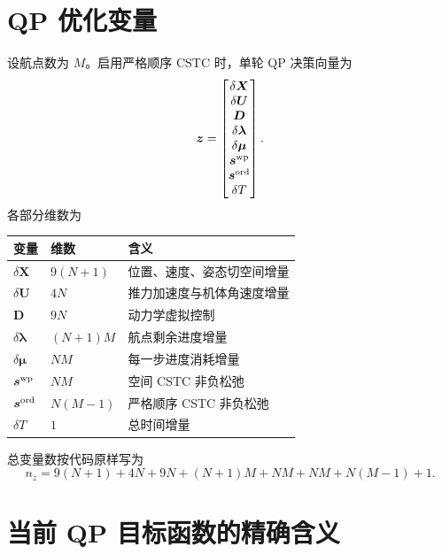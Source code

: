 \documentclass[UTF8,a4paper,11pt]{ctexart}
\begin{document}
\section{QP 优化变量}

设航点数为 $M$。启用严格顺序 CSTC 时，单轮 QP 决策向量为
\begin{equation}
 \bm z=\begin{bmatrix}
 \delta\bm X\\
 \delta\bm U\\
 \bm D\\
 \delta\bm\lambda\\
 \delta\bm\mu\\
 \bm s^{\rm wp}\\
 \bm s^{\rm ord}\\
 \delta T
 \end{bmatrix}.
 \label{eq:variables}
\end{equation}
各部分维数为
\begin{center}
\begin{tabular}{lll}
\toprule
变量 & 维数 & 含义\\
\midrule
$\delta\bm X$ & $9(N+1)$ & 位置、速度、姿态切空间增量\\
$\delta\bm U$ & $4N$ & 推力加速度与机体角速度增量\\
$\bm D$ & $9N$ & 动力学虚拟控制\\
$\delta\bm\lambda$ & $(N+1)M$ & 航点剩余进度增量\\
$\delta\bm\mu$ & $NM$ & 每一步进度消耗增量\\
$\bm s^{\rm wp}$ & $NM$ & 空间 CSTC 非负松弛\\
$\bm s^{\rm ord}$ & $N(M-1)$ & 严格顺序 CSTC 非负松弛\\
$\delta T$ & $1$ & 总时间增量\\
\bottomrule
\end{tabular}
\end{center}
总变量数按代码原样写为
\begin{equation}
 n_z=9(N+1)+4N+9N+(N+1)M+NM+NM+N(M-1)+1.
\end{equation}

\section{当前 QP 目标函数的精确含义}
\end{document}
